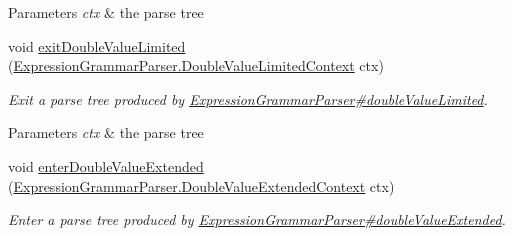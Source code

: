 \begin{DoxyCompactItemize}
\begin{DoxyCompactList}
\begin{DoxyParams}{Parameters}
{\em ctx} & the parse tree\\
\hline
\end{DoxyParams}
 \end{DoxyCompactList}\item 
void \hyperlink{classgov_1_1nasa_1_1jpf_1_1inspector_1_1server_1_1expression_1_1parser_1_1_expression_grammar_base_listener_a7116a32069e4b60665cc8709d6a33eb7}{exit\+Double\+Value\+Limited} (\hyperlink{classgov_1_1nasa_1_1jpf_1_1inspector_1_1server_1_1expression_1_1parser_1_1_expression_grammar_pa747378014be7c4ab66961e5db1be8d25}{Expression\+Grammar\+Parser.\+Double\+Value\+Limited\+Context} ctx)
\begin{DoxyCompactList}\small\item\em Exit a parse tree produced by \hyperlink{classgov_1_1nasa_1_1jpf_1_1inspector_1_1server_1_1expression_1_1parser_1_1_expression_grammar_parser_a57521cfe69d446d750563c91e30a034c}{Expression\+Grammar\+Parser\#double\+Value\+Limited}.


\begin{DoxyParams}{Parameters}
{\em ctx} & the parse tree\\
\hline
\end{DoxyParams}
 \end{DoxyCompactList}\item 
void \hyperlink{classgov_1_1nasa_1_1jpf_1_1inspector_1_1server_1_1expression_1_1parser_1_1_expression_grammar_base_listener_aeb9a6b6f6d49824cb140b901133c8ff8}{enter\+Double\+Value\+Extended} (\hyperlink{classgov_1_1nasa_1_1jpf_1_1inspector_1_1server_1_1expression_1_1parser_1_1_expression_grammar_paf529e59fbe08e921d008fd67634bb19c}{Expression\+Grammar\+Parser.\+Double\+Value\+Extended\+Context} ctx)
\begin{DoxyCompactList}\small\item\em Enter a parse tree produced by \hyperlink{classgov_1_1nasa_1_1jpf_1_1inspector_1_1server_1_1expression_1_1parser_1_1_expression_grammar_parser_ae0693f1cb83f2bfc63b96a0f9debe43f}{Expression\+Grammar\+Parser\#double\+Value\+Extended}.



\end{DoxyCompactList}
\end{DoxyCompactItemize}
